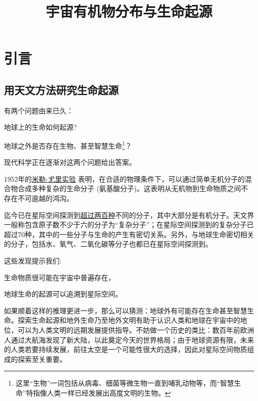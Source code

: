 \documentclass[a4paper]{article}
\title{
宇宙有机物分布与生命起源}
\author{}
\date{}
\begin{document}
\maketitle
\newpage
\tableofcontents
\newpage

\setcounter{section}{-1}
\section{引言}

\subsection{用天文方法研究生命起源}

有两个问题由来已久：
\begin{enumerate*}[label=\arabic*)]
  \item 地球上的生命如何起源?
  \item 地球之外是否存在生物、甚至智慧生命\footnote{这里“生物”一词包括从病毒、细菌等微生物一直到哺乳动物等，而“智慧生命”特指像人类一样已经发展出高度文明的生物。}？
\end{enumerate*}  
现代科学正在逐渐对这两个问题给出答案。

1952年的\href{https://en.wikipedia.org/wiki/Miller%E2%80%93Urey_experiment}{米勒-尤里实验}%
表明，在合适的物理条件下，可以通过简单无机分子的混合物合成多种复杂的生命分子 (氨基酸分子)。这表明从无机物到生命物质之间不存在不可逾越的鸿沟。

迄今已在星际空间探测到\href{http://www.astro.uni-koeln.de/cdms/molecules}{超过两百种}不同的分子，其中大部分是有机分子。天文界一般称包含原子数不少于六的分子为“复杂分子”；在星际空间探测到的复杂分子已超过70种，其中的一些分子与生命的产生有密切关系。另外，与地球生命密切相关的分子，包括水、氧气、二氧化碳等分子也都已在星际空间探测到。

这些发现提示我们: \begin{enumerate*}[label=\arabic*)]\item 生命物质很可能在宇宙中普遍存在，\item 地球生命的起源可以追溯到星际空间。\end{enumerate*} 如果顺着这样的推理更进一步，那么可以猜测：地球外有可能存在生命甚至智慧生命。探索生命起源和地外生命乃至地外文明有助于认识人类和地球在宇宙中的地位，可以为人类文明的远期发展提供指导。不妨做一个历史的类比：数百年前欧洲人通过大航海发现了新大陆，以此奠定今天的世界格局；由于地球资源有限，未来的人类若要持续发展，前往太空是一个可能性很大的选择，因此对星际空间物质组成的探索至关重要。
\end{document}
